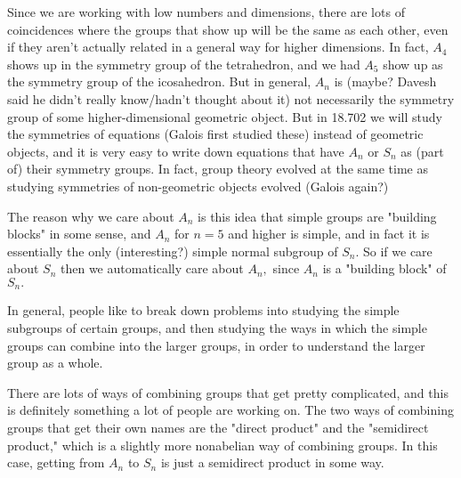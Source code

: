 \begin{ans}
Since we are working with low numbers and dimensions, there are lots of coincidences where the groups that show up will be the same as each other, even if they aren't actually related in a general way for higher dimensions. In fact, $A_4$ shows up in the symmetry group of the tetrahedron, and we had $A_5$ show up as the symmetry group of the icosahedron. But in general, $A_n$ is (maybe? Davesh said he didn't really know/hadn't thought about it) not necessarily the symmetry group of some higher-dimensional geometric object. But in 18.702 we will study the symmetries of equations (Galois first studied these) instead of geometric objects, and it is very easy to write down equations that have $A_n$ or $S_n$ as (part of) their symmetry groups. In fact, group theory evolved at the same time as studying symmetries of non-geometric objects evolved (Galois again?) 

The reason why we care about $A_n$ is this idea that simple groups are "building blocks" in some sense, and $A_n$ for $n = 5$ and higher is simple, and in fact it is essentially the only (interesting?) simple normal subgroup of $S_n.$ So if we care about $S_n$ then we automatically care about $A_n,$ since $A_n$ is a "building block" of $S_n.$ 

In general, people like to break down problems into studying the simple subgroups of certain groups, and then studying the ways in which the simple groups can combine into the larger groups, in order to understand the larger group as a whole.

There are lots of ways of combining groups that get pretty complicated, and this is definitely something a lot of people are working on. The two ways of combining groups that get their own names are the "direct product" and the "semidirect product," which is a slightly more nonabelian way of combining groups. In this case, getting from $A_n$ to $S_n$ is just a semidirect product in some way.
\end{ans}

\newpage